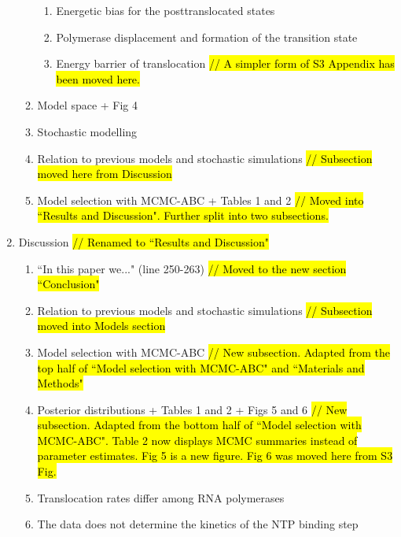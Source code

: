 \documentclass[12pt]{article}
\begin{document}
\begin{enumerate}
\begin{enumerate}
\begin{enumerate}
			\item Energetic bias for the posttranslocated states
			\item Polymerase displacement and formation of the transition state
			\item Energy barrier of translocation \hl{ // A simpler form of S3 Appendix has been moved here.}

	
		\end{enumerate}
	
		\item Model space + Fig 4
		
		\item Stochastic modelling 
		
		\item Relation to previous models and stochastic simulations \hl{ // Subsection moved here from Discussion}
		
		\item Model selection with MCMC-ABC  + Tables 1 and 2  \hl{ // Moved into ``Results and Discussion". Further split into two subsections. } 
		


	\end{enumerate}
	
	
	\item Discussion \hl{ // Renamed to ``Results and Discussion" } 
	\begin{enumerate}

		\item ``In this paper we..." (line 250-263) \hl{ // Moved to the new section ``Conclusion"}

		\item Relation to previous models and stochastic simulations \hl{ // Subsection moved into Models section}
		
		\item Model selection with MCMC-ABC \hl{ // New subsection. Adapted from the top half of ``Model selection with MCMC-ABC" and ``Materials and Methods"} 		


		\item Posterior distributions + Tables 1 and 2 + Figs 5 and 6 \hl{ // New subsection. Adapted from the bottom half of ``Model selection with MCMC-ABC". Table 2 now displays MCMC summaries instead of parameter estimates.  Fig 5 is a new figure. Fig 6 was moved here from S3 Fig.} 
		
		\item Translocation rates differ among RNA polymerases
		
		\item The data does not determine the kinetics of the NTP binding
step 


\end{enumerate}
\end{enumerate}
\end{document}
